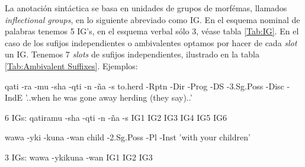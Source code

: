 \documentclass[a4paper,10pt]{scrartcl}
\begin{document}
La anotaci\'on sint\'actica se basa en unidades de grupos de morf\'emas, llamados \emph{inflectional groups}, en lo siguiente abreviado como IG.
En el esquema nominal de palabras tenemos 5 IG's, en el esquema verbal s\'olo 3, v\'ease tabla \ref{Tab:IG}.  
En el caso de los sufijos independientes o ambivalentes optamos por hacer de cada \emph{slot} un IG. Tenemos  7 \emph{slots} de sufijos independientes, ilustrado en la tabla \ref{Tab:Ambivalent Suffixes}.
Ejemplos:
\begin{examples}
 \item\label{Ex:qati} \gll qati -ra -mu -sha -qti -n -\~{n}a -s
      to.herd -Rptn -Dir -Prog -DS -3.Sg.Poss -Disc -IndE
      \glt'..when he was gone away herding (they say)..'
\glend
\item[6 IGs:] 
	\gll qatiramu -sha -qti -n -\~{n}a -s
	IG1 IG2 IG3 IG4 IG5 IG6
\glt
\glend

\item\label{Ex:wawa} \gll wawa -yki -kuna -wan
	   child -2.Sg.Poss -Pl -Inst
      \glt 'with your children'
\glend

\item[3 IGs:]
 \gll wawa -ykikuna -wan
      IG1 IG2 IG3
\glt	    
\glend

\end{examples}
\pagebreak
\end{document}
